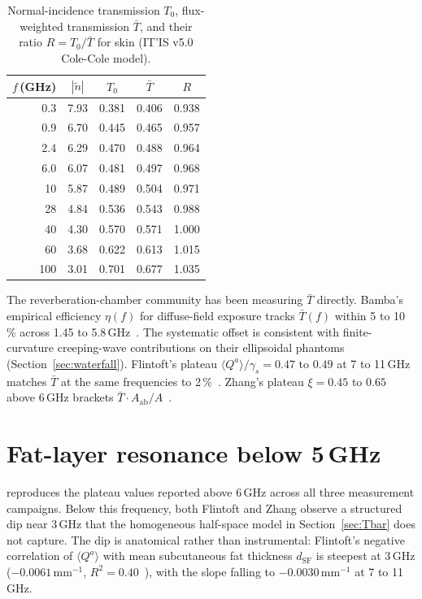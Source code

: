 \documentclass[journal,twocolumn,10pt]{IEEEtran}
\theoremstyle{plain}
\theoremstyle{remark}
\newcommand{\Aab}{A_{\mathrm{ab}}}
\newcommand{\Tbar}{\bar{T}}
\newcommand{\ntilde}{\tilde{n}}
\begin{document}
\begin{table}[!t]
\centering
\caption{Normal-incidence transmission $T_0$, flux-weighted
transmission $\Tbar$, and their ratio $R = T_0/\Tbar$ for skin
(IT'IS v5.0 Cole-Cole model).}\label{tab:Tbar}
\begin{tabular}{rcccc}
\toprule
$f$\,(GHz) & $|\ntilde|$ & $T_0$ & $\Tbar$ & $R$ \\
\midrule
0.3 & 7.93 & 0.381 & 0.406 & 0.938 \\
0.9 & 6.70 & 0.445 & 0.465 & 0.957 \\
2.4 & 6.29 & 0.470 & 0.488 & 0.964 \\
6.0 & 6.07 & 0.481 & 0.497 & 0.968 \\
10  & 5.87 & 0.489 & 0.504 & 0.971 \\
28  & 4.84 & 0.536 & 0.543 & 0.988 \\
40  & 4.30 & 0.570 & 0.571 & 1.000 \\
60  & 3.68 & 0.622 & 0.613 & 1.015 \\
100 & 3.01 & 0.701 & 0.677 & 1.035 \\
\bottomrule
\end{tabular}
\end{table}

The reverberation-chamber community has been measuring $\Tbar$
directly. Bamba's empirical efficiency $\eta(f)$ for diffuse-field
exposure tracks $\Tbar(f)$ within 5 to 10\,\% across 1.45 to
5.8\,GHz~\cite{Bamba2014}. The systematic offset is consistent with
finite-curvature creeping-wave contributions on their ellipsoidal
phantoms (Section~\ref{sec:waterfall}). Flintoft's plateau
$\langle Q^a\rangle/\gamma_s = 0.47$ to $0.49$ at 7 to 11\,GHz matches
$\Tbar$ at the same frequencies to 2\,\%~\cite{Flintoft2014}. Zhang's
plateau $\xi = 0.45$ to $0.65$ above 6\,GHz brackets
$\Tbar\cdot\Aab/A$~\cite{Zhang2017thesis}.


\section{Fat-layer resonance below 5\,GHz}\label{sec:fp}

 reproduces the plateau values reported above 6\,GHz
across all three measurement campaigns. Below this frequency, both
Flintoft and Zhang observe a structured dip near 3\,GHz that the
homogeneous half-space model in Section~\ref{sec:Tbar} does not
capture. The dip is anatomical rather than instrumental: Flintoft's
negative correlation of $\langle Q^a\rangle$ with mean subcutaneous
fat thickness $d_{\mathrm{SF}}$ is steepest at 3\,GHz
($-0.0061\,\mathrm{mm}^{-1}$, $R^2 = 0.40$~\cite[Table~6]{Flintoft2014}),
with the slope falling to $-0.0030\,\mathrm{mm}^{-1}$ at 7 to 11\,GHz.
\end{document}
